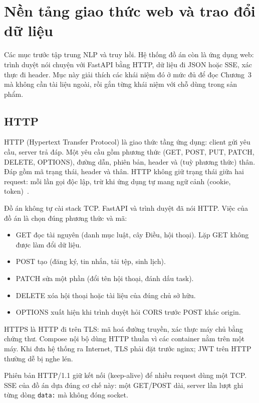 
\section{Nền tảng giao thức web và trao đổi dữ liệu}

Các mục trước tập trung NLP và truy hồi. Hệ thống đồ án còn là ứng dụng web:
trình duyệt nói chuyện với FastAPI bằng HTTP, dữ liệu đi JSON hoặc SSE, xác thực
đi header. Mục này giải thích các khái niệm đó ở mức đủ để đọc Chương~3 mà không
cần tài liệu ngoài, rồi gắn từng khái niệm với chỗ dùng trong sản phẩm.

\subsection{HTTP}

HTTP (Hypertext Transfer Protocol) là giao thức tầng ứng dụng: client gửi yêu
cầu, server trả đáp. Một yêu cầu gồm phương thức (GET, POST, PUT, PATCH, DELETE,
OPTIONS), đường dẫn, phiên bản, header và (tuỳ phương thức) thân. Đáp gồm mã
trạng thái, header và thân. HTTP không giữ trạng thái giữa hai request: mỗi lần
gọi độc lập, trừ khi ứng dụng tự mang ngữ cảnh (cookie, token)~\cite{rfc9110}.

Đồ án không tự cài stack TCP. FastAPI và trình duyệt đã nói HTTP. Việc của đồ án
là chọn đúng phương thức và mã:

\begin{itemize}
    \item GET đọc tài nguyên (danh mục luật, cây Điều, hội thoại). Lặp GET không
    được làm đổi dữ liệu.
    \item POST tạo (đăng ký, tin nhắn, tải tệp, sinh lịch).
    \item PATCH sửa một phần (đổi tên hội thoại, đánh dấu task).
    \item DELETE xóa hội thoại hoặc tài liệu của đúng chủ sở hữu.
    \item OPTIONS xuất hiện khi trình duyệt hỏi CORS trước POST khác origin.
\end{itemize}

HTTPS là HTTP đi trên TLS: mã hoá đường truyền, xác thực máy chủ bằng chứng thư.
Compose nội bộ dùng HTTP thuần vì các container nằm trên một máy. Khi đưa hệ
thống ra Internet, TLS phải đặt trước nginx; JWT trên HTTP thường dễ bị nghe lén.

Phiên bản HTTP/1.1 giữ kết nối (keep-alive) để nhiều request dùng một TCP.
SSE của đồ án dựa đúng cơ chế này: một GET/POST dài, server lần lượt ghi từng
dòng \texttt{data:} mà không đóng socket.

